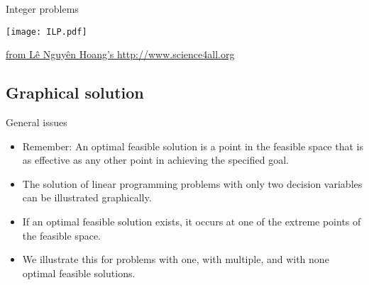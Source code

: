 \documentclass[c]{beamer}
\begin{document}
\begin{frame}[c]{Integer problems}

  \begin{center}
    \texttt{[image: ILP.pdf]}

    \href{http://www.science4all.org/article/integer-programming/}{from Lê Nguyên Hoang's http://www.science4all.org}
  \end{center}
\end{frame}

\subsection{Graphical solution}

\begin{frame}[c]{General issues}
  \begin{itemize}
    \item Remember: An optimal feasible solution is a point in the feasible space that is as effective as any other point in achieving the specified goal.
    \item The solution of linear programming problems with only two decision variables can be illustrated graphically.
    \item If an optimal feasible solution exists, it occurs at one of the extreme points of the feasible space.
    \item We illustrate this for problems with one, with multiple, and with none optimal feasible solutions.
  \end{itemize}
\end{frame}
\end{document}
